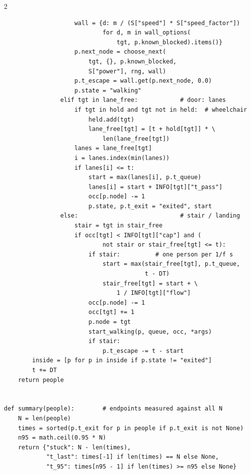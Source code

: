 \documentclass[10pt]{article}
\begin{document}
\begin{multicols*}{2}
\begin{lstlisting}
                    wall = {d: m / (S["speed"] * S["speed_factor"])
                            for d, m in wall_options(
                                tgt, p.known_blocked).items()}
                    p.next_node = choose_next(
                        tgt, {}, p.known_blocked,
                        S["power"], rng, wall)
                    p.t_escape = wall.get(p.next_node, 0.0)
                    p.state = "walking"
                elif tgt in lane_free:            # door: lanes
                    if tgt in hold and tgt not in held:  # wheelchair
                        held.add(tgt)
                        lane_free[tgt] = [t + hold[tgt]] * \
                            len(lane_free[tgt])
                    lanes = lane_free[tgt]
                    i = lanes.index(min(lanes))
                    if lanes[i] <= t:
                        start = max(lanes[i], p.t_queue)
                        lanes[i] = start + INFO[tgt]["t_pass"]
                        occ[p.node] -= 1
                        p.state, p.t_exit = "exited", start
                else:                             # stair / landing
                    stair = tgt in stair_free
                    if occ[tgt] < INFO[tgt]["cap"] and (
                            not stair or stair_free[tgt] <= t):
                        if stair:          # one person per 1/f s
                            start = max(stair_free[tgt], p.t_queue,
                                        t - DT)
                            stair_free[tgt] = start + \
                                1 / INFO[tgt]["flow"]
                        occ[p.node] -= 1
                        occ[tgt] += 1
                        p.node = tgt
                        start_walking(p, queue, occ, *args)
                        if stair:
                            p.t_escape -= t - start
        inside = [p for p in inside if p.state != "exited"]
        t += DT
    return people


def summary(people):        # endpoints measured against all N
    N = len(people)
    times = sorted(p.t_exit for p in people if p.t_exit is not None)
    n95 = math.ceil(0.95 * N)
    return {"stuck": N - len(times),
            "t_last": times[-1] if len(times) == N else None,
            "t_95": times[n95 - 1] if len(times) >= n95 else None}
\end{lstlisting}
\end{multicols*}
\end{document}
